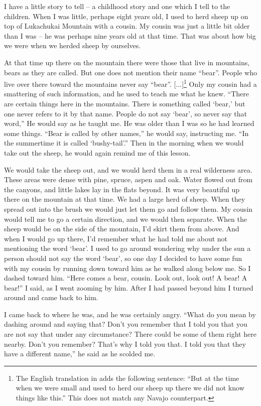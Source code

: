 I have a little story to tell -- a childhood story and one which I tell to the children. When I was little, perhaps eight years old, I used to herd sheep up on top of Lukachukai Mountain with a cousin. My cousin was just a little bit older than I was -- he was perhaps nine years old at that time. That was about how big we were when we herded sheep by ourselves.

At that time up there on the mountain there were those that live in mountains, bears as they are called. But one does not mention their name ``bear''. People who live over there toward the mountains never say ``bear''. [...]\footnote{The English translation in \citet[51]{Young:1954jz} adds the following sentence: ``But at the time when we were small and used to herd our sheep up there we did not know things like this.'' This does not match any Navajo counterpart.} Only my cousin had a smattering of such information, and he used to teach me what he knew. ``There are certain things here in the mountains. There is something called `bear,' but one never refers to it by that name. People do not say `bear', so never say that word,'' He would say as he taught me. He was older than I was so he had learned some things. ``Bear is called by other names,'' he would say, instructing me. ``In the summertime it is called `bushy-tail'.'' Then in the morning when we would take out the sheep, he would again remind me of this lesson.

We would take the sheep out, and we would herd them in a real wilderness area. These areas were dense with pine, spruce, aspen and oak. Water flowed out from the canyons, and little lakes lay in the flats beyond. It was very beautiful up there on the mountain at that time. We had a large herd of sheep. When they spread out into the brush we would just let them go and follow them. My cousin would tell me to go a certain direction, and we would then separate. When the sheep would be on the side of the mountain, I'd skirt them from above. And when I would go up there, I'd remember what he had told me about not mentioning the word `bear'. I used to go around wondering why under the sun a person should not say the word `bear', so one day I decided to have some fun with my cousin by running down toward him as he walked along below me. So I dashed toward him. ``Here comes a bear, cousin. Look out, look out! A bear! A bear!'' I said, as I went zooming by him. After I had passed beyond him I turned around and came back to him.

I came back to where he was, and he was certainly angry. ``What do you mean by dashing around and saying that? Don't you remember that I told you that you are not say that under any circumstance? There could be some of them right here nearby. Don't you remember? That's why I told you that. I told you that they have a different name,'' he said as he scolded me.


